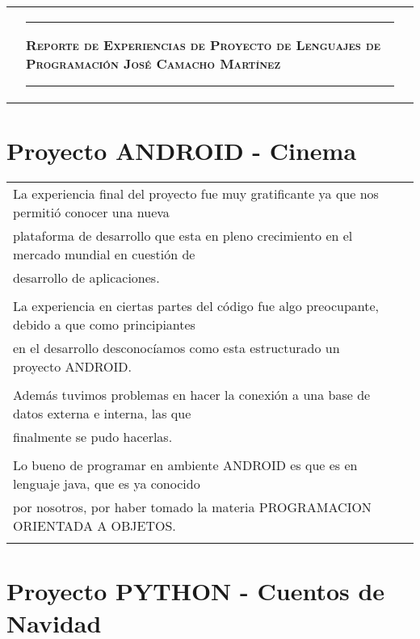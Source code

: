 \documentclass[letterpaper,11pt]{article}
\newcommand{\PreserveBackslash}[1]{\let\temp=\\#1\let\\=\temp}
\let\PBS=\PreserveBackslash
\begin{document}
\begin{tabular}{c >{\PBS\centering\vspace{-2,7cm}}p{} c}
  & \rule{11,5cm}{0.7pt} \newline \newline
 \textbf{\textsc{{\Large Reporte de Experiencias de Proyecto de Lenguajes de Programaci\'on \newline\newline Jos\'e Camacho Mart\'inez} }}\newline
 \rule{11,5cm}{0.7pt} & \newline 
\end{tabular} 



\section{Proyecto ANDROID - Cinema}

\begin{tabular}{lll}

La experiencia final del proyecto fue muy gratificante ya que nos permiti\'o conocer una nueva \\
plataforma de desarrollo que esta en pleno crecimiento en el mercado mundial en cuesti\'on de \\
desarrollo de aplicaciones.\\\\
La experiencia en ciertas partes del c\'odigo fue algo preocupante, debido a que como principiantes \\
en el desarrollo desconoc\'iamos como esta estructurado un proyecto ANDROID.\\\\
Adem\'as tuvimos problemas en hacer la conexi\'on a una base de datos externa e interna, las que\\
finalmente se pudo hacerlas.\\ \\
Lo bueno de programar en ambiente ANDROID es que es en lenguaje java, que es ya conocido\\
por nosotros, por haber tomado la materia PROGRAMACION ORIENTADA A OBJETOS.\\\\


\end{tabular}

\section{Proyecto PYTHON - Cuentos de Navidad}
\end{document}
